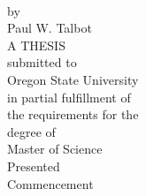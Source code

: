 
\thispagestyle{empty}

\setlength{\baselineskip}{21pt}

\begin{center}
{
   \myTitleName
\\ \vspace{0.25in}
   by
\\ \vspace{0.25in}
   Paul W. Talbot
\\ \vspace{1.0in}
   A THESIS
\\ \vspace{0.25in}
   submitted to
\\ \vspace{0.25in}
   Oregon State University
\\ \vspace{1.0in}
   in partial fulfillment of
\\
   the requirements for the
\\
   degree of
\\ \vspace{0.25in}
   Master of Science
\\ \vspace{1.0in}
   Presented \myDefenseDate
\\ 
   Commencement \myCommenceDate
}
\end{center}

\addtolength{\baselineskip}{-7pt}


